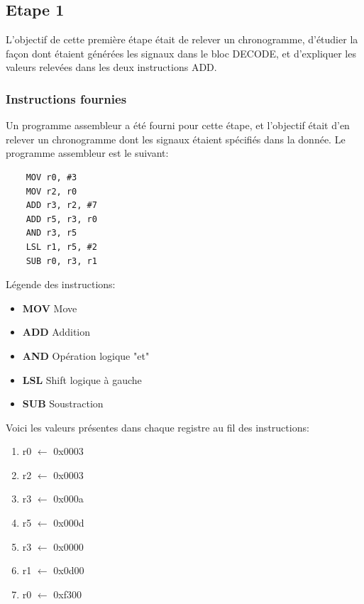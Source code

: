 \documentclass[a4paper]{article} %
\begin{document}
\subsection{Etape 1}
L'objectif de cette première étape était de relever un chronogramme, d'étudier la façon dont étaient générées les signaux dans le bloc DECODE, et d'expliquer les valeurs relevées dans les deux instructions ADD.
\subsubsection{Instructions fournies}
Un programme assembleur a été fourni pour cette étape, et l'objectif était d'en relever un chronogramme dont les signaux étaient spécifiés dans la donnée.
Le programme assembleur est le suivant:\medskip \\ 
\begin{center}
    \begin{lstlisting}
    MOV r0, #3
    MOV r2, r0
    ADD r3, r2, #7
    ADD r5, r3, r0
    AND r3, r5
    LSL r1, r5, #2
    SUB r0, r3, r1
    \end{lstlisting}
\end{center}


Légende des instructions:
\begin{itemize}
    \item \textbf{MOV} Move
    \item \textbf{ADD} Addition
    \item \textbf{AND} Opération logique "et"
    \item \textbf{LSL} Shift logique à gauche
    \item \textbf{SUB} Soustraction    
\end{itemize}
\medskip
Voici les valeurs présentes dans chaque registre au fil des instructions:
\begin{enumerate}
    \item r0 $\leftarrow$ 0x0003
    \item r2 $\leftarrow$ 0x0003
    \item r3 $\leftarrow$ 0x000a
    \item r5 $\leftarrow$ 0x000d
    \item r3 $\leftarrow$ 0x0000
    \item r1 $\leftarrow$ 0x0d00
    \item r0 $\leftarrow$ 0xf300
\end{enumerate}
\end{document}
